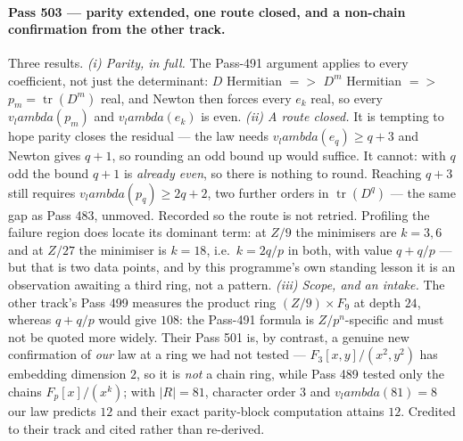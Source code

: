 \documentclass[12pt,a4paper]{article}
\def\mathbb#1{#1}%
\def\textbf#1{#1}%
\def\lambda{lambda}%
\def\Rightarrow{ => }%
\theoremstyle{definition}
\newcommand{\FF}{\mathbb{F}}
\newcommand{\ZZ}{\mathbb{Z}}
\begin{document}
\paragraph{Pass 503 --- parity extended, one route closed, and a non-chain
confirmation from the other track.}
Three results.  \emph{(i) Parity, in full.}  The Pass-491 argument applies to
every coefficient, not just the determinant: $D$ Hermitian $\Rightarrow$ $D^m$
Hermitian $\Rightarrow$ $p_m=\operatorname{tr}(D^m)$ real, and Newton then
forces every $e_k$ real, so \textbf{every $v_\lambda(p_m)$ and $v_\lambda(e_k)$
is even}.  \emph{(ii) A route closed.}  It is tempting to hope parity closes
the residual --- the law needs $v_\lambda(e_q)\ge q{+}3$ and Newton gives
$q{+}1$, so rounding an odd bound up would suffice.  \textbf{It cannot}: with
$q$ odd the bound $q{+}1$ is \emph{already even}, so there is nothing to round.
Reaching $q{+}3$ still requires $v_\lambda(p_q)\ge2q{+}2$, two further orders in
$\operatorname{tr}(D^q)$ --- the same gap as Pass 483, unmoved.  Recorded so
the route is not retried.  Profiling the failure region does locate its
dominant term: at $\ZZ/9$ the minimisers are $k=3,6$ and at $\ZZ/27$ the
minimiser is $k=18$, i.e.\ $k=2q/p$ in both, with value $q+q/p$ --- but that is
two data points, and by this programme's own standing lesson it is an
observation awaiting a third ring, not a pattern.  \emph{(iii) Scope, and an
intake.}  The other track's Pass 499 measures the product ring
$(\ZZ/9)\times\FF_9$ at depth $24$, whereas $q+q/p$ would give $108$: the
Pass-491 formula is $\ZZ/p^n$-specific and must not be quoted more widely.
Their Pass 501 is, by contrast, a genuine new confirmation of \emph{our} law at
a ring we had not tested --- $\FF_3[x,y]/(x^2,y^2)$ has embedding dimension
$2$, so it is \emph{not} a chain ring, while Pass 489 tested only the chains
$\FF_p[x]/(x^k)$; with $|R|=81$, character order $3$ and $v_\lambda(81)=8$ our
law predicts $12$ and their exact parity-block computation attains $12$.
Credited to their track and cited rather than re-derived.
\end{document}
